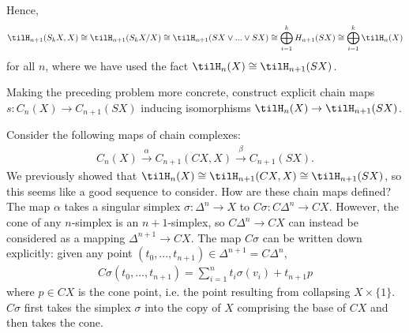 \begin{homework}[e]
\begin{prf}
\begin{center}
      \label{fig:prob1-2}
    \end{center}
    Hence,
    \begin{align*}
      \tilH_{n+1}(S_kX,X) \cong \tilH_{n+1}(S_kX/X) \cong \tilH_{n+1}(SX\vee...\vee SX) \cong \bigoplus_{i=1}^k H_{n+1}(SX) \cong \bigoplus^k_{i=1} \tilH_n(X)
    \end{align*}
    for all $n$, where we have used the fact $\tilH_n(X) \cong \tilH_{n+1}(SX)$.
  \end{prf}
   Making the preceding problem more concrete, construct explicit chain maps $s:C_n(X) \to C_{n+1}(SX)$ inducing isomorphisms $\tilH_n(X) \to \tilH_{n+1}(SX)$.
  \begin{prf}
    Consider the following maps of chain complexes:
    \begin{align*}
      C_n(X) \xrightarrow{\alpha} C_{n+1}(CX,X) \xrightarrow{\beta} C_{n+1}(SX).
    \end{align*}
    We previously showed that $\tilH_n(X) \cong \tilH_{n+1}(CX,X)\cong \tilH_{n+1}(SX)$, so this seems like a good sequence to consider. How are these chain maps defined? The map $\alpha$ takes a singular simplex $\sigma:\Delta^n\to X$ to $C\sigma:C\Delta^n\to CX$. However, the cone of any $n$-simplex is an $n+1$-simplex, so $C\Delta^n\to CX$ can instead be considered as a mapping $\Delta^{n+1}\to CX$. The map $C\sigma$ can be written down explicitly: given any point $(t_0,...,t_{n+1})\in \Delta^{n+1} = C\Delta^{n}$,
    \begin{align*}
      C\sigma(t_0,...,t_{n+1}) = \sum_{i=1}^n t_i\sigma(v_i) + t_{n+1}p
    \end{align*}
    where $p \in CX$ is the cone point, i.e. the point resulting from collapsing $X\times \{1\}$. $C\sigma$ first takes the simplex $\sigma$ into the copy of $X$ comprising the base of $CX$ and then takes the cone.


\end{prf}
\end{homework}
